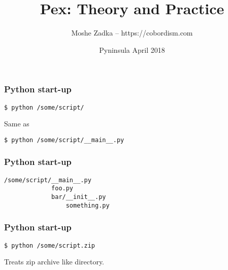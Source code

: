 \usepackage[utf8]{inputenc}
\usepackage{listings}

\title{Pex: Theory and Practice}
\author{Moshe Zadka -- https://cobordism.com}
\date{Pyninsula April 2018}
 

 
\frame{\titlepage}

\maketitle


\begin{frame}
\frametitle{Python start-up}
\begin{lstlisting}
$ python /some/script/
\end{lstlisting}
Same as
\begin{lstlisting}
$ python /some/script/__main__.py
\end{lstlisting}
\end{frame}


\begin{frame}
\frametitle{Python start-up}
\begin{lstlisting}
/some/script/__main__.py
             foo.py
             bar/__init__.py
                 something.py
\end{lstlisting}
\end{frame}

\begin{frame}
\frametitle{Python start-up}
\begin{lstlisting}
$ python /some/script.zip
\end{lstlisting}
Treats zip archive like directory.
\end{frame}

